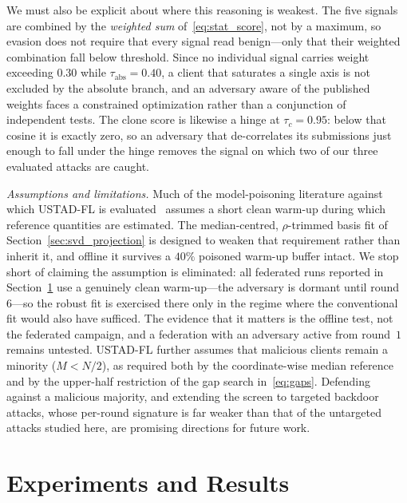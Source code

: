 \documentclass[journal]{IEEEtran}
\begin{document}
We must also be explicit about where this reasoning is weakest. The five signals are combined by the \emph{weighted sum} of~\eqref{eq:stat_score}, not by a maximum, so evasion does not require that every signal read benign---only that their weighted combination fall below threshold. Since no individual signal carries weight exceeding $0.30$ while $\tau_{\mathrm{abs}} = 0.40$, a client that saturates a single axis is not excluded by the absolute branch, and an adversary aware of the published weights faces a constrained optimization rather than a conjunction of independent tests. The clone score is likewise a hinge at $\tau_c = 0.95$: below that cosine it is exactly zero, so an adversary that de-correlates its submissions just enough to fall under the hinge removes the signal on which two of our three evaluated attacks are caught.

\noindent\textit{Assumptions and limitations.} Much of the model-poisoning literature against which USTAD-FL is evaluated~\cite{baruch2019little, shejwalkar2021manipulating} assumes a short clean warm-up during which reference quantities are estimated. The median-centred, $\rho$-trimmed basis fit of Section~\ref{sec:svd_projection} is designed to weaken that requirement rather than inherit it, and offline it survives a $40\%$ poisoned warm-up buffer intact. We stop short of claiming the assumption is eliminated: all federated runs reported in Section~\ref{sec:experiments} use a genuinely clean warm-up---the adversary is dormant until round~$6$---so the robust fit is exercised there only in the regime where the conventional fit would also have sufficed. The evidence that it matters is the offline test, not the federated campaign, and a federation with an adversary active from round~$1$ remains untested. USTAD-FL further assumes that malicious clients remain a minority ($M < N/2$), as required both by the coordinate-wise median reference and by the upper-half restriction of the gap search in~\eqref{eq:gaps}. Defending against a malicious majority, and extending the screen to targeted backdoor attacks, whose per-round signature is far weaker than that of the untargeted attacks studied here, are promising directions for future work.

\section{Experiments and Results}
\label{sec:experiments}
\end{document}
